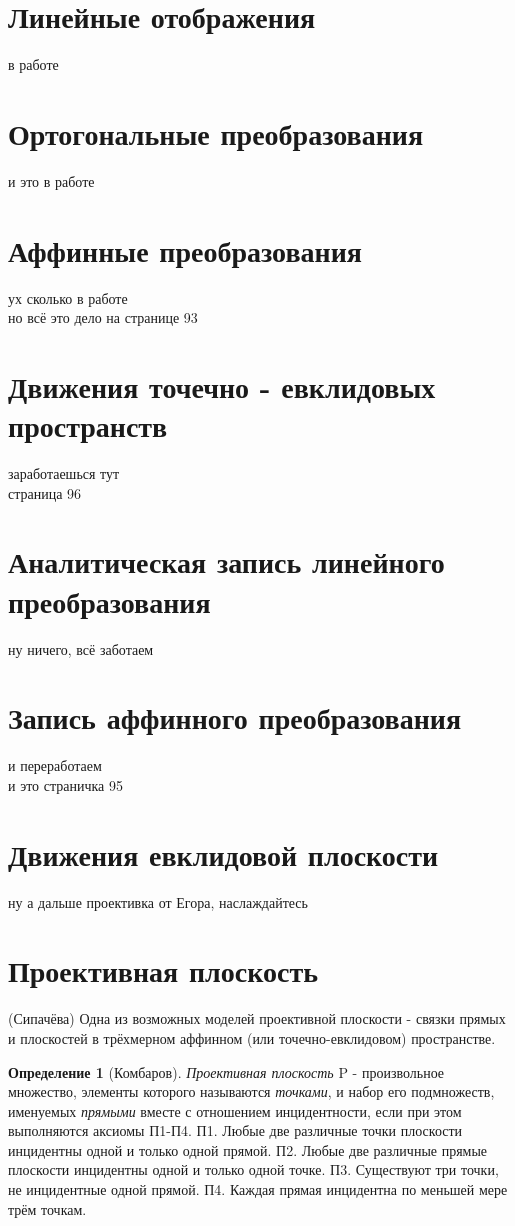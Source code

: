 \documentclass[a4paper, 12pt]{article}
\theoremstyle{definition}
\newtheorem*{definition}{Определение}
\begin{document}
\section{Линейные отображения}
в работе

\section{Ортогональные преобразования}
и это в работе

\section{Аффинные преобразования}
ух сколько в работе\\
но всё это дело на странице 93

\section{Движения точечно - евклидовых пространств}
заработаешься тут\\
страница 96

\section{Аналитическая запись линейного преобразования}
ну ничего, всё заботаем

\section{Запись аффинного преобразования}
и переработаем\\
и это страничка 95

\section{Движения евклидовой плоскости}
ну а дальше проективка от Егора, наслаждайтесь

\section{Проективная плоскость}
(Сипачёва) Одна из возможных моделей проективной плоскости - связки прямых и плоскостей в трёхмерном аффинном (или точечно-евклидовом) пространстве.
\begin{definition}[Комбаров]
    \textit{Проективная плоскость} P - произвольное множество, элементы которого называются \textit{точками}, и набор его подмножеств, именуемых \textit{прямыми} вместе с отношением инцидентности, если при этом выполняются аксиомы П1-П4. \newline
    П1. Любые две различные точки плоскости инцидентны одной и только одной прямой. \newline
    П2. Любые две различные прямые плоскости инцидентны одной и только одной точке. \newline
    П3. Существуют три точки, не инцидентные одной прямой. \newline
    П4. Каждая прямая инцидентна по меньшей мере трём точкам.
\end{definition}
\end{document}
